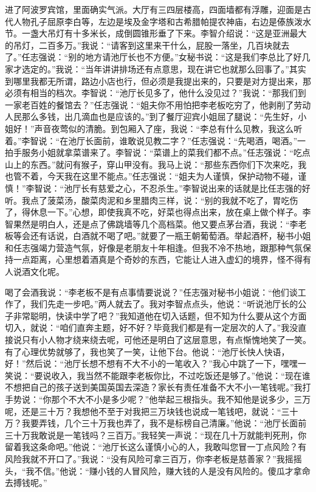\documentclass[12pt,oneside]{book}
\begin{document}
进了阿波罗宾馆，里面确实气派。大厅有三四层楼高，四面墙都有浮雕，迎面是古代人物孔子屈原李白等，左边是埃及金字塔和古希腊帕提农神庙，右边是傣族泼水节。一盏大吊灯有十多米长，成倒圆锥形垂了下来。李智介绍说：``这是亚洲最大的吊灯，二百多万。''我说：``请客到这里来干什么，屁股一落坐，几百块就去了。''任志强说：``别的地方请池厅长也不方便。''女秘书说：``这是我们李总比了好几家才选定的。''我说：``当年讲讲排场还有点意思，现在讲它也就那么回事了。''其实到哪里我都无所谓，路边小店也行，但必须是我提出来的，只要是对方提出来，那必须有相当的档次。李智说：``池厅长见多了，他什么没见过？''我说：``那我们到一家老百姓的餐馆去？''任志强说：``姐夫你不用怕把李老板吃穷了，他剥削了劳动人民那么多钱，出几滴血也是应该的。''到了餐厅迎宾小姐屈了腿说：``先生好，小姐好！''声音夜莺似的清脆。到包厢入了座，我说：``李总有什么见教，我这么听着。''李智说：``在池厅长面前，谁敢说见教二字？''任志强说：``先喝酒，喝酒。''一拍手服务小姐就拿菜谱来了。李智说：``菜谱上的菜我们都不点。''任志强说：``吃点山上的东西。''就问有猴子，穿山甲没有。我马上说：``那些东西你们下次来吃，我也管不着，今天我在这里不能点。''任志强说：``姐夫为人谨慎，保护动物不碰，谨慎！''李智说：``池厅长有慈爱之心，不忍杀生。''李智说出来的话就是比任志强的好听。我点了菠菜汤，酸菜肉泥和乡里腊肉三样，说：``别的我就不吃了，胃吃伤了，得休息一下。''心想，即使我真不吃，好菜也得点出来，放在桌上做个样子。李智果然是明白人，还是点了佛跳墙等几个高档菜。他又要点茅台酒，我说：``李老板等会还有话说，白酒就不喝了吧。''就要了一瓶王朝葡萄酒。举起酒杯，秘书小姐和任志强竭力营造气氛，好像是老朋友十年相逢。但我不冷不热地，跟那种气氛保持一点距离，心里想着酒真是个奇妙的东西，它能让人进入虚幻的境界，怪不得有人说酒文化呢。

喝了会酒我说：``李老板不是有点事情要说说？''任志强对秘书小姐说：``他们谈工作了，我们先走一步吧。''两人就去了。我对李智点点头，他说：``听说池厅长的公子非常聪明，快读中学了吧？''我知道他在切入话题，但不知为什么要从这个方面切入，就说：``咱们直奔主题，好不好？毕竟我们都是有一定层次的人了。''我没直接说只有小人物才绕来绕去呢，可他还是明白了这层意思，有点惭愧地笑了一笑。有了心理优势就够了，我也笑了一笑，让他下台。他说：``池厅长快人快语，好！''然后说：``池厅长想不想有不大不小的一笔收入？''我心中跳了一下，嘿嘿一笑说：``要说收入，我当然不能跟李老板你比，不过吃饭还是够了。''他说：``现在谁不想把自己的孩子送到美国英国去深造？家长有责任准备不大不小一笔钱呢。''我打手势说：``你那个不大不小是多少呢？''他举起三根指头。我不知他是说多少，三万呢，还是三十万？我想他不至于对我把三万块钱也说成一笔钱吧，就说：``三十万？我要弄钱，几个三十万我也弄了，我不是标榜自己清廉。''他说：``池厅长面前三十万我敢说是一笔钱吗？三百万。''我轻笑一声说：``现在几十万就能判死刑，你留着我这条命吧。''他说：``池厅长这么谨慎小心的人，我敢叫您冒一丁点风险？有风险我就不开口了。''我说：``没有风险可拿三百万，你李老板是慈善家？''我摇摇头，``我不信。''他说：``赚小钱的人冒风险，赚大钱的人是没有风险的。傻瓜才拿命去搏钱呢。''
\end{document}
